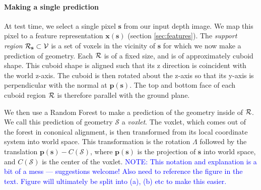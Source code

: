 \documentclass[10pt,twocolumn,letterpaper]{article}
\makeatletter
\renewcommand*{\ie}{i.e.\@\xspace}
\newcommand{\pixelidx}{\mathbf{s}}
\newcommand{\voxelgrid}{\mathcal{V}}
\newcommand{\project}{\mathbf{p}}
\newcommand{\point}{\mathbf{p}}
\newcommand{\normal}{\mathbf{n}}
\newcommand{\updir}{\mathbf{u}}
\newcommand{\note}[1]{\textcolor{blue}{NOTE: #1}}
\newcommand{\remove}[1]{\textcolor{grey}{#1}}
\makeatother
\begin{document}
\paragraph{Making a single prediction}
At test time, we select a single pixel $\pixelidx$ from our input depth image.
We map this pixel to a feature representation $\mathbf{x}(\pixelidx)$ (section \ref{sec:features}).
The \emph{support region} $\voxregion_\pixelidx \subset \voxelgrid$ is a set of voxels in the vicinity of $\pixelidx$ for which we now make a prediction of geometry.
Each $\mathcal{R}$ is of a fixed size, and is of approximately cuboid shape.
This cuboid shape is aligned such that its z direction is coincident with the world z-axis. 
The cuboid is then rotated about the z-axis so that its y-axis is perpendicular with the normal at $\project(\pixelidx)$.
The top and bottom face of each cuboid region $\mathcal{R}$ is therefore parallel with the ground plane.


We then use a Random Forest to make a prediction of the geometry inside of $\mathcal{R}$.
We call this prediction of geometry $\mathcal{S}$ a \emph{voxlet}.
The voxlet, which comes out of the forest in cononical alignment, is then transformed from its local coordinate system into world space.
This transformation is the rotation $\Lambda$ followed by the translation $\mathbf{p}(\mathbf{\pixelidx}) - C(\mathcal{S})$, where $\mathbf{p}(\mathbf{\pixelidx})$ is the projection of $\pixelidx$ into world space, and $C(\mathcal{S})$ is the center of the voxlet. \note{This notation and explanation is a bit of a mess --- suggestions welcome! Also need to reference the figure in the text. Figure will ultimately be split into (a), (b) etc to make this easier.}
\end{document}
